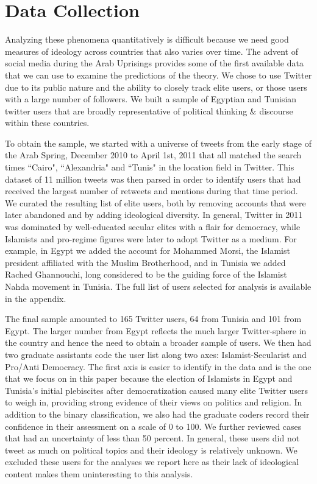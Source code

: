 \documentclass[12pt]{article}
\begin{document}
\section*{Data Collection}
Analyzing these phenomena quantitatively is difficult because we need good measures of ideology across countries that also varies over time. The advent of social media during the Arab Uprisings provides some of the first available data that we can use to examine the predictions of the theory. We chose to use Twitter due to its public nature and the ability to closely track elite users, or those users with a large number of followers. We built a sample of Egyptian and Tunisian twitter users that are broadly representative of political thinking \& discourse within these countries.

To obtain the sample, we started with a universe of tweets from the early stage of the Arab Spring, December 2010 to April 1st, 2011 that all matched the search times ``Cairo", ``Alexandria" and ``Tunis" in the location field in Twitter.  This dataset of 11 million tweets was then parsed in order to identify users that had received the largest number of retweets and mentions during that time period. We curated the resulting list of elite users, both by removing accounts that were later abandoned and by adding ideological diversity. In general, Twitter in 2011 was dominated by well-educated secular elites with a flair for democracy, while Islamists and pro-regime figures were later to adopt Twitter as a medium. For example, in Egypt we added the account for Mohammed Morsi, the Islamist president affiliated with the Muslim Brotherhood, and in Tunisia we added Rached Ghannouchi, long considered to be the guiding force of the Islamist Nahda movement in Tunisia. The full list of users selected for analysis is available in the appendix.

The final sample amounted to 165 Twitter users, 64 from Tunisia and 101 from Egypt. The larger number from Egypt reflects the much larger Twitter-sphere in the country and hence the need to obtain a broader sample of users. We then had two graduate assistants code the user list along two axes: Islamist-Secularist and Pro/Anti Democracy. The first axis is easier to identify in the data and is the one that we focus on in this paper because the election of Islamists in Egypt and Tunisia's initial plebiscites after democratization caused many elite Twitter users to weigh in, providing strong evidence of their views on politics and religion. In addition to the binary classification, we also had the graduate coders record their confidence in their assessment on a scale of 0 to 100. We further reviewed cases that had an uncertainty of less than 50 percent. In general, these users did not tweet as much on political topics and their ideology is relatively unknown. We excluded these users for the analyses we report here as their lack of ideological content makes them uninteresting to this analysis.
\end{document}

